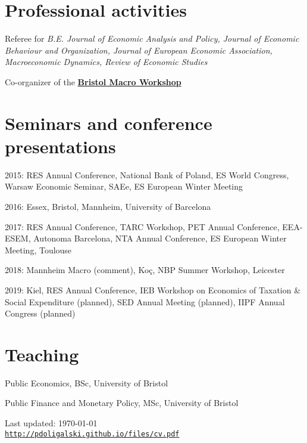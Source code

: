 \documentclass[letterpaper]{article}
\def\footerlink{http://pdoligalski.github.io/files/cv.pdf}
\renewenvironment{itemize}{
  \begin{list}{}{
    \setlength{\leftmargin}{1.5em}
  }
}{
  \end{list}
}
\begin{document}
\section*{Professional activities}
\begin{itemize}
\item Referee for \textit{B.E. Journal of Economic Analysis and Policy, Journal of Economic Behaviour and Organization, Journal of European Economic Association, Macroeconomic Dynamics, Review of Economic Studies}
\item Co-organizer of the \href{http://pdoligalski.github.io/BristolMacro/index.html}{\textbf{Bristol Macro Workshop}}
\end{itemize}

\section*{Seminars and conference presentations}
\begin{itemize}
  \item 2015: RES Annual Conference, National Bank of Poland, ES World Congress, Warsaw Economic Seminar, SAEe, ES European Winter Meeting
  \item 2016: Essex, Bristol, Mannheim, University of Barcelona
  \item 2017: RES Annual Conference, TARC Workshop, PET Annual Conference, EEA-ESEM, Autonoma Barcelona, NTA Annual Conference, ES European Winter Meeting, Toulouse 
  \item 2018: Mannheim Macro (comment), Ko\c{c}, NBP Summer Workshop, Leicester
  \item 2019: Kiel, RES Annual Conference, IEB Workshop on Economics of Taxation \& Social Expenditure (planned), SED Annual Meeting (planned), IIPF Annual Congress (planned)
\end{itemize}

\section*{Teaching}
\begin{itemize}
  \item Public Economics, BSc, University of Bristol
  \item Public Finance and Monetary Policy, MSc, University of Bristol
\end{itemize}

\bigskip

\begin{center}
  \begin{footnotesize}
    Last updated: \today \\
    \href{\footerlink}{\texttt{\footerlink}}
  \end{footnotesize}
\end{center}
\end{document}
